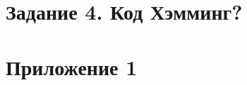 \documentclass[a5paper, 10pt]{article}
\theoremstyle{definition}
\theoremstyle{plain}
\theoremstyle{remark}
\begin{document}
\section{Задание 4. Код Хэмминг?}
\newpage
\section{Приложение 1}
\begin{figure}[h!]
\begin{minipage}[h!]{0.49\linewidth}
\end{minipage}
\label{ris:image1}
\end{figure}
\end{document}
